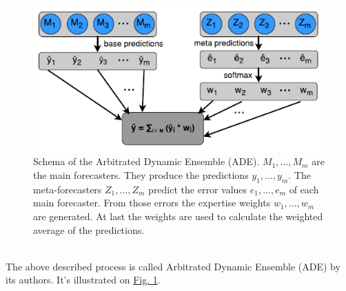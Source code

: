 \documentclass[runningheads,a4paper]{llncs}[2015/06/24]
\begin{document}
\begin{figure}[h]
\centering
\includegraphics[width=\textwidth]{adeSchema}
\caption{Schema of the Arbitrated Dynamic Ensemble (ADE). $M_1, ... ,M_m$ are the main forecasters. They produce the predictions $y_1, ... ,y_m$. The meta-forecasters $Z_1, ... ,Z_m$ predict the error values $e_1, ... ,e_m$ of each main forecaster. From those errors the expertise weights $w_1, ... ,w_m$ are generated. At last the weights are used to calculate the weighted average of the predictions. \cite{VtorCerqueira2017}}
\label{fig:adeSchema}
\end{figure} 
 
\vspace{-\topsep}
\hspace{1cm}\\ The above described process is called Arbitrated Dynamic Ensemble (ADE) by its authors. It's illustrated on \hyperref[fig:adeSchema]{Fig. \ref{fig:adeSchema}}. 
\end{document}
